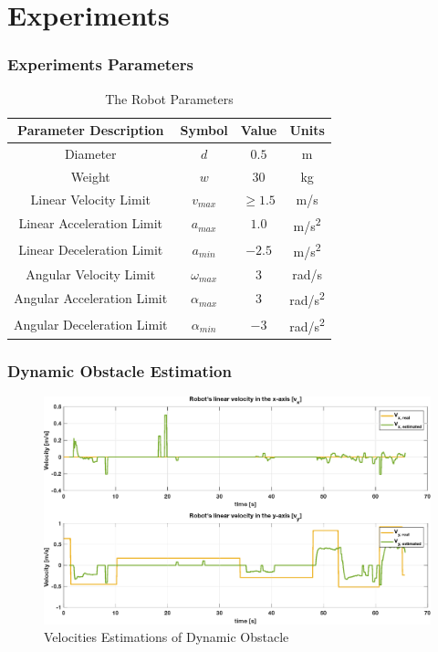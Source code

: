 \section{Experiments}

	\begin{frame}
		\frametitle{Experiments Parameters}
		\begin{table}[H]
			\centering
			\begin{tabular}{|c|c|c|c|}
				\hline
				\rowcolor{tugreen}
				Parameter Description & Symbol & Value & Units\\
				\hline
				\rowcolor{tugreen!20}
				Diameter 							 & $d$ 					  & $0.5$ & \si[per-mode=symbol]{\meter}\\
				\rowcolor{tugreen!20}
				Weight 								 & $w$ 					  & $30$ &  \si[per-mode=symbol]{\kilogram}\\
				\rowcolor{tugreen!20}
				Linear Velocity Limit 			& $v_{max}$ 		  & $\ge 1.5$ &  \si[per-mode=symbol]{\meter \per \second}\\ 
				\rowcolor{tugreen!20}
				Linear Acceleration Limit    & $a_{max}$  		   & $1.0$ & \si[per-mode=symbol]{\meter \per \second \squared}\\
				\rowcolor{tugreen!20}
				Linear Deceleration Limit    & $a_{min}$  		   & $-2.5$ & \si[per-mode=symbol]{\meter \per \second \squared}\\
				\rowcolor{tugreen!20}
				Angular Velocity Limit 		  &$\omega_{max}$ & $3$ & \si[per-mode=symbol]{\radian \per \second}\\
				\rowcolor{tugreen!20}
				Angular Acceleration Limit & $\alpha_{max}$  & $3$ & \si[per-mode=symbol]{\radian \per \second \squared}\\
				\rowcolor{tugreen!20}
				Angular Deceleration Limit & $\alpha_{min}$  & $-3$ & \si[per-mode=symbol]{\radian \per \second \squared} \\
				\hline
			\end{tabular}
			\caption{The Robot Parameters}
		\end{table}
 	\end{frame}
 
	\begin{frame}
		\frametitle{Dynamic Obstacle Estimation}
		\begin{figure}[hbtp]
			\centering
			\includegraphics[scale=0.4]{pictures/estimate.eps}
			\caption{Velocities Estimations of Dynamic Obstacle}
		\end{figure}
	\end{frame}

